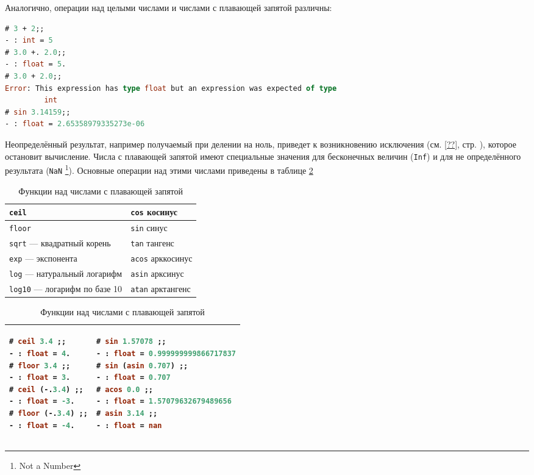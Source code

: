 Аналогично, операции над целыми числами и числами с плавающей запятой различны:

\begin{lstlisting}[language=OCaml]
# 3 + 2;;
- : int = 5
# 3.0 +. 2.0;;
- : float = 5.
# 3.0 + 2.0;;
Error: This expression has type float but an expression was expected of type
         int
# sin 3.14159;;
- : float = 2.65358979335273e-06
\end{lstlisting}

Неопределённый результат, например получаемый при делении на ноль, приведет к
возникновению исключения (см. \ref{??}, стр. \pageref{??}), которое остановит
вычисление. Числа с плавающей запятой имеют специальные значения для бесконечных
величин (\texttt{Inf}) и для не определённого результата (\texttt{NaN}
\footnote{Not a Number}). Основные операции над этими числами приведены в
таблице \ref{tbl:functions_on_floats}

\begin{table}[hl]
\begin{center}
	\caption{Функции над числами с плавающей запятой}
	\begin{tabular}{|p{7.2cm}|p{7.2cm}|}
	\hline
	\texttt{ceil} & \texttt{cos} косинус \\
	\hline
	\texttt{floor} & \texttt{sin} синус \\
	\hline
	\texttt{sqrt} --- квадратный корень & \texttt{tan} тангенс \\
	\hline
	\texttt{exp} --- экспонента & \texttt{acos} арккосинус \\
	\hline
	\texttt{log} --- натуральный логарифм & \texttt{asin} арксинус \\
	\hline
	\texttt{log10} --- логарифм по базе 10 & \texttt{atan} арктангенс \\
	\hline
	\end{tabular}
	\begin{tabular}{|p{7.2cm}|p{7.2cm}|}
	\hline
{\begin{lstlisting}[language=OCaml,frame=none]
# ceil 3.4 ;;
- : float = 4.
# floor 3.4 ;;
- : float = 3.
# ceil (-.3.4) ;;
- : float = -3.
# floor (-.3.4) ;;
- : float = -4.
\end{lstlisting}}
 &
{\begin{lstlisting}[language=OCaml,frame=none]
# sin 1.57078 ;;
- : float = 0.999999999866717837
# sin (asin 0.707) ;;
- : float = 0.707
# acos 0.0 ;;
- : float = 1.57079632679489656
# asin 3.14 ;;
- : float = nan
\end{lstlisting}}
\\
	\hline
	\end{tabular}
	\label{tbl:functions_on_floats}
\end{center}
\end{table}

